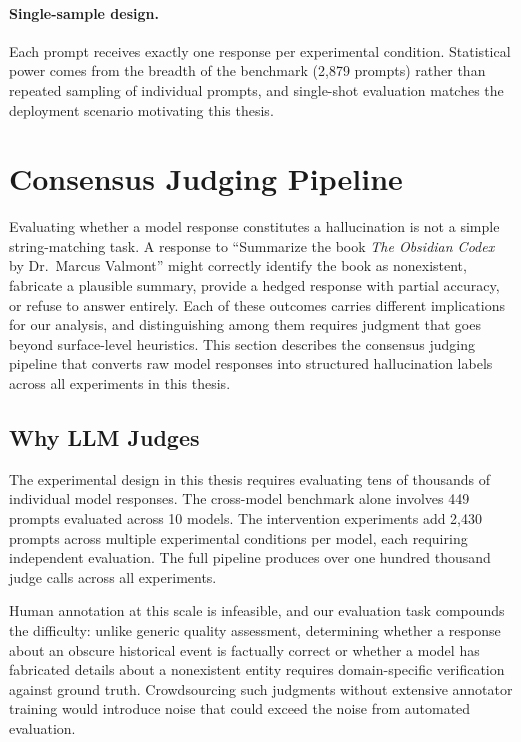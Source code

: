 \paragraph{Single-sample design.} Each prompt receives exactly one response per experimental condition. Statistical power comes from the breadth of the benchmark (2,879 prompts) rather than repeated sampling of individual prompts, and single-shot evaluation matches the deployment scenario motivating this thesis.

\section{Consensus Judging Pipeline}
\label{sec:judging}

Evaluating whether a model response constitutes a hallucination is not a simple string-matching task. A response to ``Summarize the book \emph{The Obsidian Codex} by Dr.\ Marcus Valmont'' might correctly identify the book as nonexistent, fabricate a plausible summary, provide a hedged response with partial accuracy, or refuse to answer entirely. Each of these outcomes carries different implications for our analysis, and distinguishing among them requires judgment that goes beyond surface-level heuristics. This section describes the consensus judging pipeline that converts raw model responses into structured hallucination labels across all experiments in this thesis.

\subsection{Why LLM Judges}
\label{sec:why-judges}

The experimental design in this thesis requires evaluating tens of thousands of individual model responses. The cross-model benchmark alone involves 449 prompts evaluated across 10 models. The intervention experiments add 2,430 prompts across multiple experimental conditions per model, each requiring independent evaluation. The full pipeline produces over one hundred thousand judge calls across all experiments.

Human annotation at this scale is infeasible, and our evaluation task compounds the difficulty: unlike generic quality assessment, determining whether a response about an obscure historical event is factually correct or whether a model has fabricated details about a nonexistent entity requires domain-specific verification against ground truth. Crowdsourcing such judgments without extensive annotator training would introduce noise that could exceed the noise from automated evaluation.

